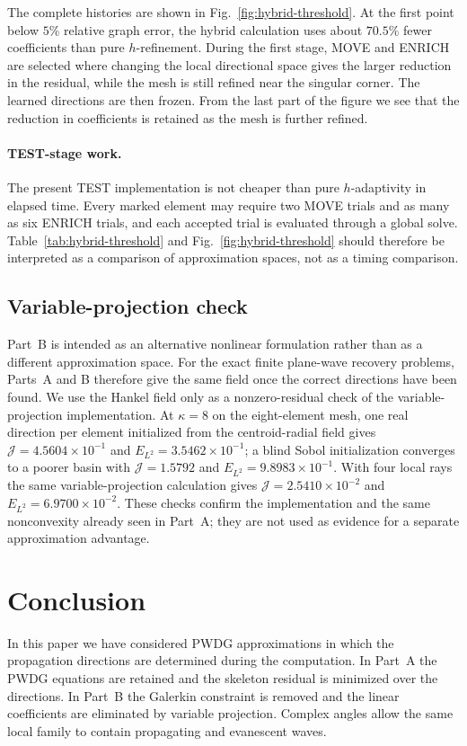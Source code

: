 \documentclass[pdflatex,sn-mathphys-num]{sn-jnl}
\theoremstyle{thmstyleone}
\theoremstyle{thmstyletwo}
\begin{document}
The complete histories are shown in Fig.~\ref{fig:hybrid-threshold}.  At the first point below $5\%$ relative graph error, the hybrid calculation uses about $70.5\%$ fewer coefficients than pure $h$-refinement.  During the first stage, MOVE and ENRICH are selected where changing the local directional space gives the larger reduction in the residual, while the mesh is still refined near the singular corner.  The learned directions are then frozen.  From the last part of the figure we see that the reduction in coefficients is retained as the mesh is further refined.

\paragraph{TEST-stage work.}
The present TEST implementation is not cheaper than pure $h$-adaptivity in elapsed time.  Every marked element may require two MOVE trials and as many as six ENRICH trials, and each accepted trial is evaluated through a global solve.  Table~\ref{tab:hybrid-threshold} and Fig.~\ref{fig:hybrid-threshold} should therefore be interpreted as a comparison of approximation spaces, not as a timing comparison.

\subsection{Variable-projection check}\label{subsec:joint-results}
Part~B is intended as an alternative nonlinear formulation rather than as a different approximation space.  For the exact finite plane-wave recovery problems, Parts~A and B therefore give the same field once the correct directions have been found.  We use the Hankel field only as a nonzero-residual check of the variable-projection implementation.  At $\kappa=8$ on the eight-element mesh, one real direction per element initialized from the centroid-radial field gives $\mathcal J=4.5604\times10^{-1}$ and $E_{L^2}=3.5462\times10^{-1}$; a blind Sobol initialization converges to a poorer basin with $\mathcal J=1.5792$ and $E_{L^2}=9.8983\times10^{-1}$.  With four local rays the same variable-projection calculation gives $\mathcal J=2.5410\times10^{-2}$ and $E_{L^2}=6.9700\times10^{-2}$.  These checks confirm the implementation and the same nonconvexity already seen in Part~A; they are not used as evidence for a separate approximation advantage.

\section{Conclusion}\label{sec:conclusion}
In this paper we have considered PWDG approximations in which the propagation directions are determined during the computation.  In Part~A the PWDG equations are retained and the skeleton residual is minimized over the directions.  In Part~B the Galerkin constraint is removed and the linear coefficients are eliminated by variable projection.  Complex angles allow the same local family to contain propagating and evanescent waves.
\end{document}
